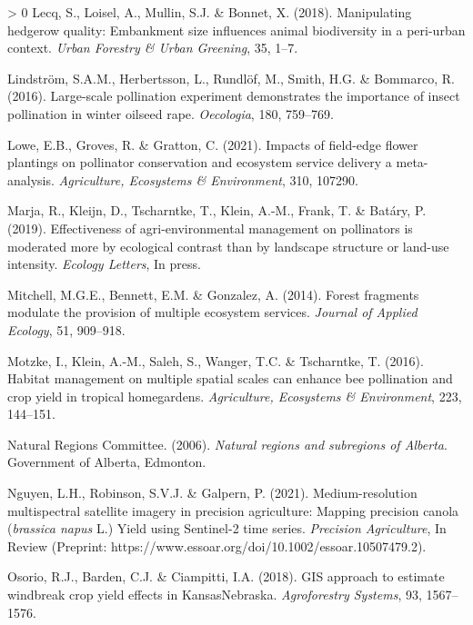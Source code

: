 \documentclass[]{elsarticle} %
\newlength{\cslhangindent}
\newenvironment{CSLReferences}[3] %
 {%
  \setlength{\parindent}{0pt}
  \ifodd #1 \everypar{\setlength{\hangindent}{\cslhangindent}}\ignorespaces\fi
  \ifnum #2 > 0
  \setlength{\parskip}{#2\baselineskip}
  \fi
 }%
 {}
\begin{document}
\begin{CSLReferences}{1}{0}
\leavevmode\hypertarget{ref-lecq2018}{}%
Lecq, S., Loisel, A., Mullin, S.J. \& Bonnet, X. (2018). Manipulating hedgerow quality: Embankment size influences animal biodiversity in a peri-urban context. \emph{Urban Forestry {\&} Urban Greening}, 35, 1--7.

\leavevmode\hypertarget{ref-lindstrom2016}{}%
Lindström, S.A.M., Herbertsson, L., Rundlöf, M., Smith, H.G. \& Bommarco, R. (2016). Large-scale pollination experiment demonstrates the importance of insect pollination in winter oilseed rape. \emph{Oecologia}, 180, 759--769.

\leavevmode\hypertarget{ref-lowe2021}{}%
Lowe, E.B., Groves, R. \& Gratton, C. (2021). Impacts of field-edge flower plantings on pollinator conservation and ecosystem service delivery {{}} a meta-analysis. \emph{Agriculture, Ecosystems {\&} Environment}, 310, 107290.

\leavevmode\hypertarget{ref-marja2019}{}%
Marja, R., Kleijn, D., Tscharntke, T., Klein, A.-M., Frank, T. \& Batáry, P. (2019). Effectiveness of agri-environmental management on pollinators is moderated more by ecological contrast than by landscape structure or land-use intensity. \emph{Ecology Letters}, In press.

\leavevmode\hypertarget{ref-mitchell2014}{}%
Mitchell, M.G.E., Bennett, E.M. \& Gonzalez, A. (2014). Forest fragments modulate the provision of multiple ecosystem services. \emph{Journal of Applied Ecology}, 51, 909--918.

\leavevmode\hypertarget{ref-motzke2016}{}%
Motzke, I., Klein, A.-M., Saleh, S., Wanger, T.C. \& Tscharntke, T. (2016). Habitat management on multiple spatial scales can enhance bee pollination and crop yield in tropical homegardens. \emph{Agriculture, Ecosystems \& Environment}, 223, 144--151.

\leavevmode\hypertarget{ref-ABRegions2006}{}%
Natural Regions Committee. (2006). \emph{Natural regions and subregions of {Alberta}}. Government of Alberta, Edmonton.

\leavevmode\hypertarget{ref-nguyen2021}{}%
Nguyen, L.H., Robinson, S.V.J. \& Galpern, P. (2021). Medium-resolution multispectral satellite imagery in precision agriculture: Mapping precision canola (\emph{brassica napus} {L.}) Yield using {Sentinel-2} time series. \emph{Precision Agriculture}, In Review (Preprint: https://www.essoar.org/doi/10.1002/essoar.10507479.2).

\leavevmode\hypertarget{ref-osorio2018}{}%
Osorio, R.J., Barden, C.J. \& Ciampitti, I.A. (2018). {GIS} approach to estimate windbreak crop yield effects in {Kansas}{{}}{Nebraska}. \emph{Agroforestry Systems}, 93, 1567--1576.


\end{CSLReferences}
\end{document}
